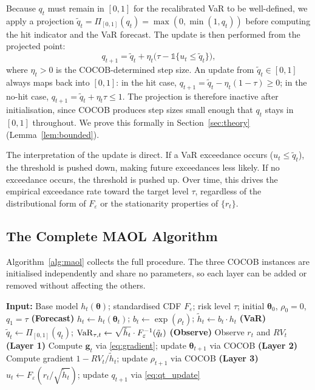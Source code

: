 Because $q_t$ must remain in $[0,1]$ for the recalibrated VaR to be well-defined, we apply a projection $\tilde{q}_t = \Pi_{[0,1]}(q_t) = \max(0, \min(1, q_t))$ before computing the hit indicator and the VaR forecast. The update is then performed from the projected point:
\begin{equation}\label{eq:qt_update}
    q_{t+1} = \tilde{q}_t + \eta_t\bigl(\tau - \mathds{1}\{u_t \leq \tilde{q}_t\}\bigr),
\end{equation}
where $\eta_t > 0$ is the COCOB-determined step size. An update from $\tilde{q}_t \in [0,1]$ always maps back into $[0,1]$: in the hit case, $q_{t+1} = \tilde{q}_t - \eta_t(1-\tau) \geq 0$; in the no-hit case, $q_{t+1} = \tilde{q}_t + \eta_t\tau \leq 1$. The projection is therefore inactive after initialisation, since COCOB produces step sizes small enough that $q_t$ stays in $[0,1]$ throughout. We prove this formally in Section~\ref{sec:theory} (Lemma~\ref{lem:bounded}).

The interpretation of the update is direct. If a VaR exceedance occurs ($u_t \leq \tilde{q}_t$), the threshold is pushed down, making future exceedances less likely. If no exceedance occurs, the threshold is pushed up. Over time, this drives the empirical exceedance rate toward the target level $\tau$, regardless of the distributional form of $F_\varepsilon$ or the stationarity properties of $\{r_t\}$.

\subsection{The Complete MAOL Algorithm}\label{sec:complete}

Algorithm~\ref{alg:maol} collects the full procedure. The three COCOB instances are initialised independently and share no parameters, so each layer can be added or removed without affecting the others.

\begin{algorithm}[H]
\caption{Model-Assisted Online Learning (MAOL) Wrapper}
\label{alg:maol}
\begin{algorithmic}[1]
\State \textbf{Input:} Base model $h_t(\boldsymbol{\theta})$; standardised CDF $F_\varepsilon$; risk level $\tau$; initial $\boldsymbol{\theta}_0$, $\rho_0 = 0$, $q_1 = \tau$
    \State \textbf{(Forecast)} $h_t \gets h_t(\boldsymbol{\theta}_t)$; \quad $b_t \gets \exp(\rho_t)$; \quad $\tilde{h}_t \gets b_t \cdot h_t$
    \State \textbf{(VaR)} $\tilde{q}_t \gets \Pi_{[0,1]}(q_t)$; \quad $\mathrm{VaR}_{\tau,t} \gets \sqrt{\tilde{h}_t} \cdot F_\varepsilon^{-1}(\tilde{q}_t)$
    \State \textbf{(Observe)} Observe $r_t$ and $RV_t$
    \State \textbf{(Layer 1)} Compute $\mathbf{g}_t$ via \eqref{eq:gradient}; update $\boldsymbol{\theta}_{t+1}$ via COCOB
    \State \textbf{(Layer 2)} Compute gradient $1 - RV_t/\tilde{h}_t$; update $\rho_{t+1}$ via COCOB
    \State \textbf{(Layer 3)} $u_t \gets F_\varepsilon(r_t / \sqrt{\tilde{h}_t})$; update $q_{t+1}$ via \eqref{eq:qt_update}
\EndFor
\end{algorithmic}
\end{algorithm}


